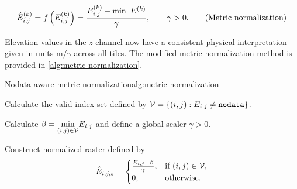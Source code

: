 \begin{equation*}
  \hat{\lidarraster}_{i,j}^{(k)}
  =
  f\left(\lidarraster_{i,j}^{(k)}\right)
  =
  \frac{%
    \lidarraster_{i,j}^{(k)} - \min~\lidarraster^{(k)}
  }{%
    \gamma
  },%
  \hspace{2em} \gamma > 0.
  \tag{Metric normalization} %
  \label{test}
\end{equation*}

Elevation values in the $z$ channel now have a consistent physical interpretation given in units $\si{\meter} / \gamma$ across all tiles.
The modified metric normalization method is provided in \cref{alg:metric-normalization}.

\begin{algorithm}{Nodata-aware metric normalization}{alg:metric-normalization}
  \item Calculate the valid index set defined by $\mathcal{V} = \{(i, j): E_{i,j} \neq \texttt{nodata}\}$.
  \item Calculate $\beta = \underset{(i,j) \in \mathcal{V}}{\min} E_{i,j}$ and define a global scaler $\gamma > 0$.
  \item Construct normalized raster defined by
    \begin{equation*}
        \hat{E}_{i,j,z} = \begin{cases}
          \frac{E_{i,j} - \beta}{\gamma}, & \text{if } (i,j) \in \mathcal{V}, \\
          0, & \text{otherwise.}
        \end{cases}
    \end{equation*}
\end{algorithm}
